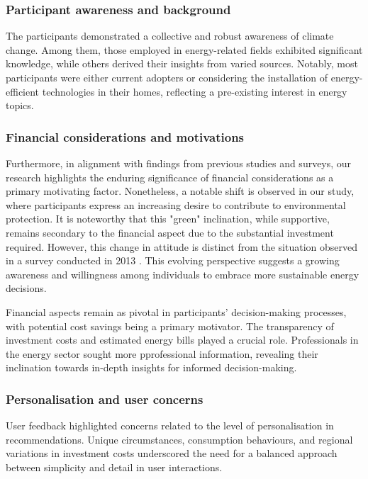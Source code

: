 \subsubsection*{Participant awareness and background}

The participants demonstrated a collective and robust awareness of climate change. 
Among them, those employed in energy-related fields exhibited significant knowledge, while others derived their insights from varied sources. 
Notably, most participants were either current adopters or considering the installation of energy-efficient technologies in their homes, reflecting a pre-existing interest in energy topics.


\subsubsection*{Financial considerations and motivations}

Furthermore, in alignment with findings from previous studies and surveys, our research highlights the enduring significance of financial considerations as a primary motivating factor. 
Nonetheless, a notable shift is observed in our study, where participants express an increasing desire to contribute to environmental protection.
It is noteworthy that this "green" inclination, while supportive, remains secondary to the financial aspect due to the substantial investment required. 
However, this change in attitude is distinct from the situation observed in a survey conducted in 2013 \cite{informationgap}. 
This evolving perspective suggests a growing awareness and willingness among individuals to embrace more sustainable energy decisions.

Financial aspects remain as pivotal in participants' decision-making processes, with potential cost savings being a primary motivator. 
The transparency of investment costs and estimated energy bills played a crucial role. 
Professionals in the energy sector sought more pprofessional information, revealing their inclination towards in-depth insights for informed decision-making.


\subsubsection*{Personalisation and user concerns}

User feedback highlighted concerns related to the level of personalisation in recommendations. 
Unique circumstances, consumption behaviours, and regional variations in investment costs underscored the need for a balanced approach between simplicity and detail in user interactions.


